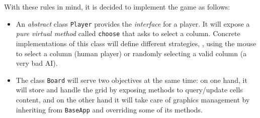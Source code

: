 \documentclass{article}
\begin{document}
With these rules in mind, it is decided to implement the game as follows:

\begin{itemize}
  \item An \emph{abstract} class \texttt{Player} provides the \emph{interface} for a player. It will expose a \emph{pure virtual method} called \texttt{choose} that asks to select a column. Concrete implementations of this class will define different strategies, \eg, using the mouse to select a column (human player) or randomly selecting a valid column (a very bad AI).
  \item The class \texttt{Board} will serve two objectives at the same time: on one hand, it will store and handle the grid by exposing methods to query/update cells content, and on the other hand it will take care of graphics management by inheriting from \texttt{BaseApp} and overriding some of its methods. 
\end{itemize}
\end{document}
